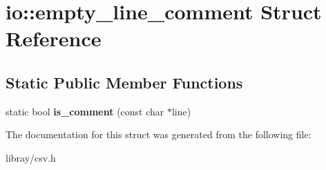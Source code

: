 \hypertarget{structio_1_1empty__line__comment}{}\section{io\+:\+:empty\+\_\+line\+\_\+comment Struct Reference}
\label{structio_1_1empty__line__comment}
\subsection*{Static Public Member Functions}
\begin{DoxyCompactItemize}
\item 
\mbox{\label{structio_1_1empty__line__comment_a88e2cee044a9aafabf3e2a0e64fa5289}} 
static bool {\bfseries is\+\_\+comment} (const char $\ast$line)
\end{DoxyCompactItemize}


The documentation for this struct was generated from the following file\+:\begin{DoxyCompactItemize}
\item 
libray/csv.\+h\end{DoxyCompactItemize}
